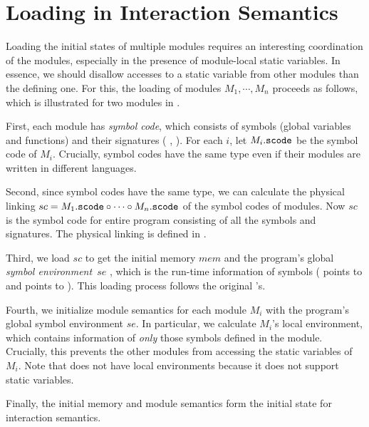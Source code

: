 \section{Loading in Interaction Semantics}
\label{sec:main-semantics:loading}



Loading the initial states of multiple modules requires an interesting
coordination of the modules, especially in the presence of module-local static variables.  In essence, we
should disallow accesses to a static variable from other modules than the defining one.  For
this, the loading of modules $M_1, \cdots, M_n$ proceeds as follows, which is illustrated for two
modules in .

First, each module has \emph{symbol code}, which consists of symbols (\ie global variables and functions) and their
signatures (\eg{} , ).  For each $i$, let $M_i.\texttt{scode}$ be the
symbol code of $M_i$.  Crucially, symbol codes have the same type even if their modules are written
in different languages.

Second, since symbol codes have the same type, we can calculate the physical linking
$sc = M_1.\texttt{scode} \circ \cdots \circ M_n.\texttt{scode}$ of the symbol codes of modules.  Now
$sc$ is the symbol code for entire program consisting of all the symbols and signatures.  The
physical linking is defined in \cite{kang:scc}.

Third, we load $sc$ to get the initial memory $mem$ 
and the program's global \emph{symbol environment}~$se$ ,
which is the run-time information of symbols (\eg{}  points to
 and  points to ).  This loading process follows the original \cc{}'s.

Fourth, we initialize module semantics for each module $M_i$ with the program's global symbol
environment $se$.  In particular, we calculate $M_i$'s local environment, which contains information
of \emph{only} those symbols defined in the module.  Crucially, this prevents the other modules from
accessing the static variables of $M_i$. Note that \ccc{} does not have local environments because it does not support static variables.

Finally, the initial memory and module semantics form the initial state for interaction semantics.


